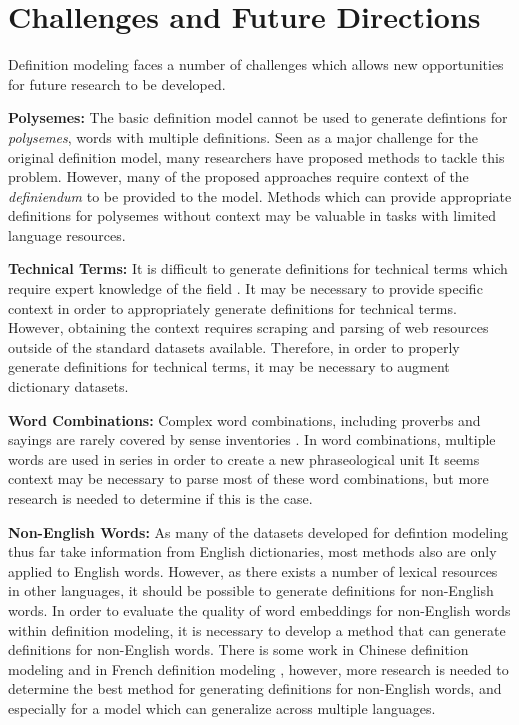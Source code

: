 \section{Challenges and Future Directions}
Definition modeling faces a number of challenges which allows new opportunities
for future research to be developed.

\textbf{Polysemes:} The basic definition model cannot be used to generate
defintions for \textit{polysemes}, words with multiple definitions. Seen as a
major challenge for the original definition model, many researchers have
proposed methods to tackle this problem. However, many of the proposed
approaches require context of the \textit{definiendum} to be provided to the
model. Methods which can provide appropriate definitions for polysemes without
context may be valuable in tasks with limited language resources.

\textbf{Technical Terms:} It is difficult to generate definitions for technical
terms which require expert knowledge of the field \cite{huang_cdm_2021}. It may
be necessary to provide specific context in order to appropriately generate
definitions for technical terms. However, obtaining the context requires
scraping and parsing of web resources outside of the standard datasets
available. Therefore, in order to properly generate definitions for technical
terms, it may be necessary to augment dictionary datasets.

\textbf{Word Combinations:} Complex word combinations, including proverbs and
sayings are rarely covered by sense inventories
\cite{bevilacqua_generationary_2020}. In word combinations, multiple words are
used in series in order to create a new phraseological unit %
It seems context may be necessary to parse most of these word combinations, but
more research is needed to determine if this is the case.

\textbf{Non-English Words:} As many of the datasets developed for defintion
modeling thus far take information from English dictionaries, most methods also
are only applied to English words. However, as there exists a number of lexical
resources in other languages, it should be possible to generate definitions for
non-English words. In order to evaluate the quality of word embeddings for
non-English words within definition modeling, it is necessary to develop a
method that can generate definitions for non-English words. There is some work
in Chinese definition modeling \cite{zheng_decompose_2021} and in French
definition modeling \cite{reid_vcdm_2020}, however, more research is needed to
determine the best method for generating definitions for non-English words, and
especially for a model which can generalize across multiple languages.


